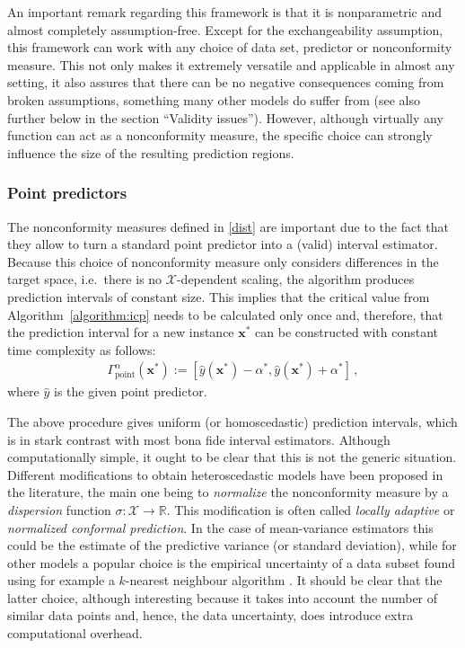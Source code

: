 \documentclass[smallcondensed]{svjour3}
\begin{document}
    An important remark regarding this framework is that it is nonparametric and almost completely assumption-free. Except for the exchangeability assumption, this framework can work with any choice of data set, predictor or nonconformity measure. This not only makes it extremely versatile and applicable in almost any setting, it also assures that there can be no negative consequences coming from broken assumptions, something many other models do suffer from (see also further below in the section ``Validity issues''). However, although virtually any function can act as a nonconformity measure, the specific choice can strongly influence the size of the resulting prediction regions.

\subsubsection*{Point predictors}

    The nonconformity measures defined in \eqref{dist} are important due to the fact that they allow to turn a standard point predictor into a (valid) interval estimator. Because this choice of nonconformity measure only considers differences in the target space, i.e.\ there is no $\mathcal{X}$-dependent scaling, the algorithm produces prediction intervals of constant size. This implies that the critical value from Algorithm~\ref{algorithm:icp} needs to be calculated only once and, therefore, that the prediction interval for a new instance $\mathbf{x}^*$ can be constructed with constant time complexity as follows:
    \begin{gather}
        \Gamma^\alpha_{\text{point}}(\mathbf{x}^*) := \left[\hat{y}(\mathbf{x}^*) - \alpha^*, \hat{y}(\mathbf{x}^*) + \alpha^*\right]\,,
    \end{gather}
    where $\hat{y}$ is the given point predictor.

    The above procedure gives uniform (or homoscedastic) prediction intervals, which is in stark contrast with most bona fide interval estimators. Although computationally simple, it ought to be clear that this is not the generic situation. Different modifications to obtain heteroscedastic models have been proposed in the literature, the main one being to \textit{normalize} \cite{papadopoulos2008normalized} the nonconformity measure by a \textit{dispersion} function $\sigma:\mathcal{X}\rightarrow\mathbb{R}$. This modification is often called \textit{locally adaptive} or \textit{normalized conformal prediction}. In the case of mean-variance estimators this could be the estimate of the predictive variance (or standard deviation), while for other models a popular choice is the empirical uncertainty of a data subset found using for example a $k$-nearest neighbour algorithm \cite{papadopoulos2011regression}. It should be clear that the latter choice, although interesting because it takes into account the number of similar data points and, hence, the data uncertainty, does introduce extra computational overhead.
\end{document}

